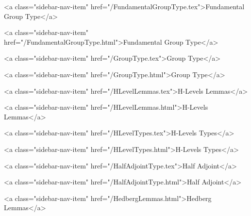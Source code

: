       
        
          <a class="sidebar-nav-item" href="/FundamentalGroupType.tex">Fundamental Group Type</a>
        
      
    
      
        
          <a class="sidebar-nav-item" href="/FundamentalGroupType.html">Fundamental Group Type</a>
        
      
    
      
        
          <a class="sidebar-nav-item" href="/GroupType.tex">Group Type</a>
        
      
    
      
        
          <a class="sidebar-nav-item" href="/GroupType.html">Group Type</a>
        
      
    
      
        
          <a class="sidebar-nav-item" href="/HLevelLemmas.tex">H-Levels Lemmas</a>
        
      
    
      
        
          <a class="sidebar-nav-item" href="/HLevelLemmas.html">H-Levels Lemmas</a>
        
      
    
      
        
          <a class="sidebar-nav-item" href="/HLevelTypes.tex">H-Levels Types</a>
        
      
    
      
        
          <a class="sidebar-nav-item" href="/HLevelTypes.html">H-Levels Types</a>
        
      
    
      
        
          <a class="sidebar-nav-item" href="/HalfAdjointType.tex">Half Adjoint</a>
        
      
    
      
        
          <a class="sidebar-nav-item" href="/HalfAdjointType.html">Half Adjoint</a>
        
      
    
      
        
          <a class="sidebar-nav-item" href="/HedbergLemmas.html">Hedberg Lemmas</a>
        
